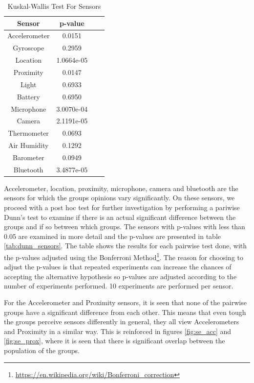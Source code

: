 \begin{table}[h!]
  \centering
  \caption{Kuskal-Wallis Test For Sensors}
  \label{tab:kw_sensors}
  \begin{tabular}{cccc}
    \toprule
     Sensor & p-value \\
    \midrule
    Accelerometer & 0.0151 \\
    Gyroscope & 0.2959\\
    Location & 1.0664e-05\\
    Proximity & 0.0147\\ 
    Light & 0.6933\\
    Battery & 0.6950\\ 
    Microphone & 3.0070e-04\\
    Camera & 2.1191e-05\\
    Thermometer & 0.0693\\ 
    Air Humidity & 0.1292\\
    Barometer & 0.0949\\
    Bluetooth & 3.4877e-05\\ 
    \bottomrule
  \end{tabular}
\end{table} 

Accelerometer, location, proximity, microphone, camera and bluetooth are the sensors for which the groups opinions vary significantly.
On these sensors, we proceed with a post hoc test for further investigation by performing a pariwise Dunn's test to examine if there is an actual significant difference between the groups and if so between which groups. The sensors with p-values with less than 0.05 are examined in more detail and the p-values are presented in table \ref{tab:dunn_sensors}. The table shows the results for each pairwise test done, with the p-values adjusted using the Bonferroni Method\footnote{\url{https://en.wikipedia.org/wiki/Bonferroni\_correction}}. The reason for choosing to adjust the p-values is that repeated experiments can increase the chances of accepting the alternative hypothesis so p-values are adjusted according to the number of experiments performed. 10 experiments are performed per sensor.

For the Accelerometer and Proximity sensors, it is seen that none of the pairwise groups have a significant difference from each other. This means that even tough the groups perceive sensors differently in general, they all view Accelerometers and Proximity in a similar way. This is reinforced in figures \ref{fig:se_acc} and \ref{fig:se_prox}, where it is seen that there is significant overlap between the population of the groups.

